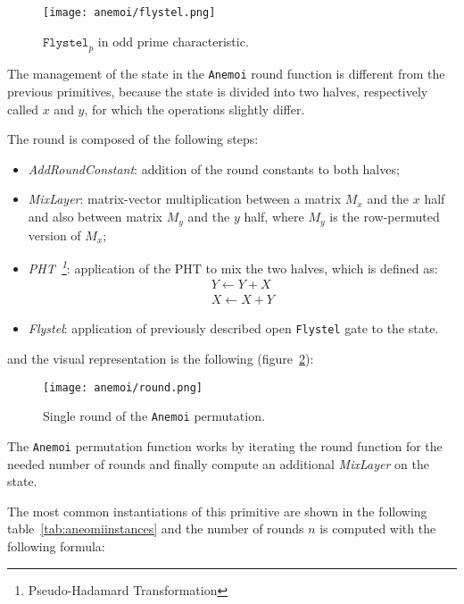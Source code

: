 \documentclass[12pt, a4paper]{report}
\begin{document}
\begin{figure}[H]
  \begin{center}
    \texttt{[image: anemoi/flystel.png]}
  \end{center}
  \caption{$\texttt{Flystel}_p$ in odd prime characteristic.}\label{fig:flystel}
\end{figure}

The management of the state in the \texttt{Anemoi} round function is different from the previous primitives, because the state is divided into two halves, respectively called $x$ and $y$, for which the operations slightly differ.

The round is composed of the following steps:
\begin{itemize}
  \item \textit{AddRoundConstant}: addition of the round constants to both halves;
  \item \textit{MixLayer}: matrix-vector multiplication between a matrix $M_x$ and the $x$ half and also between matrix $M_y$ and the $y$ half, where $M_y$ is the row-permuted version of $M_x$;
  \item \textit{PHT~\footnote{Pseudo-Hadamard Transformation}}: application of the PHT to mix the two halves, which is defined as:
      \begin{gather}
        Y \leftarrow Y + X \\
        X \leftarrow X + Y
        \label{eq:pht}
      \end{gather}
  \item \textit{Flystel}: application of previously described open \texttt{Flystel} gate to the state.
\end{itemize}
and the visual representation is the following (figure~\ref{fig:anemoi}):
\begin{figure}[H]
  \begin{center}
    \texttt{[image: anemoi/round.png]}
  \end{center}
  \caption{Single round of the \texttt{Anemoi} permutation.}\label{fig:anemoi}
\end{figure}

The \texttt{Anemoi} permutation function works by iterating the round function for the needed number of rounds and finally compute an additional \textit{MixLayer} on the state.

The most common instantiations of this primitive are shown in the following table~\ref{tab:aneomiinstances} and the number of rounds $n$ is computed with the following formula:
\end{document}
